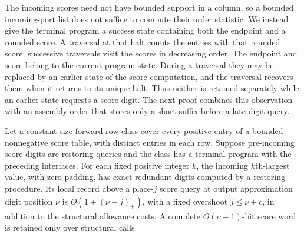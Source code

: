 The incoming scores need not have bounded support in a column, so a
bounded incoming-port list does not suffice to compute their order statistic.  We
instead give the terminal program a success state containing both the
endpoint and a rounded score.  A traversal at that halt counts the
entries with that rounded score; successive traversals visit the scores
in decreasing order.  The endpoint and score belong to the current
program state.  During a traversal they may be replaced by an earlier state
of the score computation, and the traversal recovers them when it returns
to its unique halt.  Thus neither is retained separately while an
earlier state requests a score digit.  The next proof combines this
observation with an assembly order that stores only a short suffix
before a late digit query.

\begin{lemma}\label{lem:ctrl-score-rank}
Let a constant-size forward row class cover every positive entry of a
bounded nonnegative score table, with distinct entries in each row.
Suppose pre-incoming score digits are restoring queries and the class
has a terminal program with the preceding interfaces. For each fixed
positive integer $k$, the incoming $k$th-largest value, with zero
padding, has exact redundant digits computed by a restoring procedure.  Its local record above a place-$j$ score
query at output approximation digit position $\nu$ is $O(1+(\nu-j)_+)$, with a fixed
overshoot $j\le \nu+c$, in addition to
the structural allowance costs.  A complete $O(\nu+1)$-bit score word is
retained only over structural calls.
\end{lemma}

